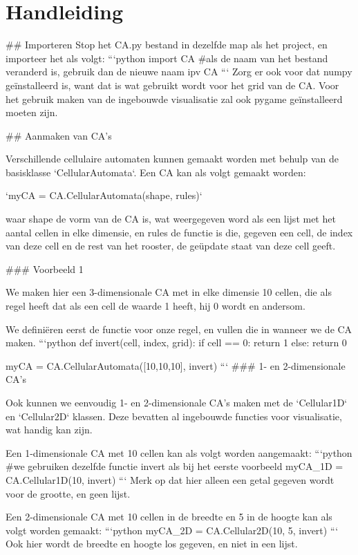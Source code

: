 \documentclass{article}
\begin{document}
\section{Handleiding}
\begin{markdown}


## Importeren
Stop het CA.py bestand in dezelfde map als het project, en importeer het als volgt:
```python
import CA
#als de naam van het bestand veranderd is, gebruik dan de nieuwe naam ipv CA
```
Zorg er ook voor dat numpy geïnstalleerd is, want dat is wat gebruikt wordt voor het grid van de CA. Voor het gebruik maken van de ingebouwde visualisatie zal ook pygame geïnstalleerd moeten zijn.

## Aanmaken van CA's

Verschillende cellulaire automaten kunnen gemaakt worden met behulp van de basisklasse `CellularAutomata`. Een CA kan als volgt gemaakt worden:

`myCA = CA.CellularAutomata(shape, rules)`

waar shape de vorm van de CA is, wat weergegeven word als een lijst met het aantal cellen in elke dimensie, en rules de functie is die, gegeven een cell, de index van deze cell en de rest van het rooster, de geüpdate staat van deze cell geeft. 

### Voorbeeld 1

We maken hier een 3-dimensionale CA met in elke dimensie 10 cellen, die als regel heeft dat als een cell de waarde 1 heeft, hij 0 wordt en andersom.

We definiëren eerst de functie voor onze regel, en vullen die in wanneer we de CA maken. 
```python
def invert(cell, index, grid):
    if cell == 0:
        return 1
    else:
        return 0

myCA = CA.CellularAutomata([10,10,10], invert)
```
### 1- en 2-dimensionale CA's

Ook kunnen we eenvoudig 1- en 2-dimensionale CA's maken met de  `Cellular1D` en `Cellular2D` klassen. Deze bevatten al ingebouwde functies voor visualisatie, wat handig kan zijn.

Een 1-dimensionale CA met 10 cellen kan als volgt worden aangemaakt:
```python
#we gebruiken dezelfde functie invert als bij het eerste voorbeeld
myCA_1D = CA.Cellular1D(10, invert)
```
Merk op dat hier alleen een getal gegeven wordt voor de grootte, en geen lijst. 

Een 2-dimensionale CA met 10 cellen in de breedte en 5 in de hoogte kan als volgt worden gemaakt:
```python
myCA_2D = CA.Cellular2D(10, 5, invert)
```
Ook hier wordt de breedte en hoogte los gegeven, en niet in een lijst. 


\end{markdown}
\end{document}
